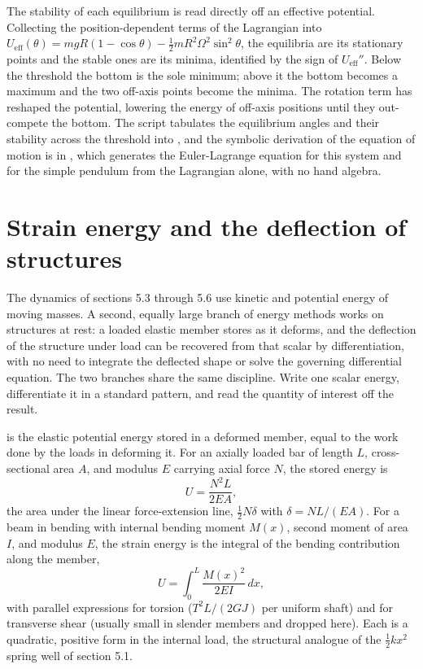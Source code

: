 The stability of each equilibrium is read directly off an effective
potential. Collecting the position-dependent terms of the Lagrangian
into $U_\text{eff}(\theta) = m g R(1 - \cos\theta) - \tfrac12 m R^2
\Omega^2 \sin^2\theta$, the equilibria are its stationary points and the
stable ones are its minima, identified by the sign of $U_\text{eff}''$.
Below the threshold the bottom is the sole minimum; above it the bottom
becomes a maximum and the two off-axis points become the minima. The
rotation term has reshaped the potential, lowering the energy of
off-axis positions until they out-compete the bottom. The script
 tabulates the equilibrium angles and
their stability across the threshold into
, and the symbolic derivation of the
equation of motion is in , which
generates the Euler-Lagrange equation for this system and for the
simple pendulum from the Lagrangian alone, with no hand algebra.



\section{Strain energy and the deflection of structures}

The dynamics of sections 5.3 through 5.6 use kinetic and potential
energy of moving masses. A second, equally large branch of energy
methods works on structures at rest: a loaded elastic member stores
 as it deforms, and the deflection of the
structure under load can be recovered from that scalar by
differentiation, with no need to integrate the deflected shape or solve
the governing differential equation. The two branches share the same
discipline. Write one scalar energy, differentiate it in a standard
pattern, and read the quantity of interest off the result.

 is the elastic potential energy stored in a
deformed member, equal to the work done by the loads in deforming it.
For an axially loaded bar of length $L$, cross-sectional area $A$, and
modulus $E$ carrying axial force $N$, the stored energy is
\[
U = \frac{N^2 L}{2 E A},
\]
the area under the linear force-extension line, $\tfrac12 N \delta$ with
$\delta = NL/(EA)$. For a beam in bending with internal bending moment
$M(x)$, second moment of area $I$, and modulus $E$, the strain energy is
the integral of the bending contribution along the member,
\[
U = \int_0^L \frac{M(x)^2}{2 E I}\,dx,
\]
with parallel expressions for torsion ($T^2 L / (2GJ)$ per uniform shaft)
and for transverse shear (usually small in slender members and dropped
here). Each is a quadratic, positive form in the internal load, the
structural analogue of the $\tfrac12 k x^2$ spring well of
section 5.1.

